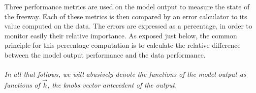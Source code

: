 Three performance metrics are used on the model output to measure the state of the freeway. Each of these metrics is then compared by an error calculator to its value computed on the data.
The errors are expressed as a percentage, in order to monitor easily their relative importance. As exposed just below, the common principle for this percentage computation is to calculate the relative difference between the model output performance and the data performance.\\
\\
\emph{In all that follows, we will abusively denote the functions of the model output as functions of $\vec{k}$, the knobs vector antecedent of the output.}\\